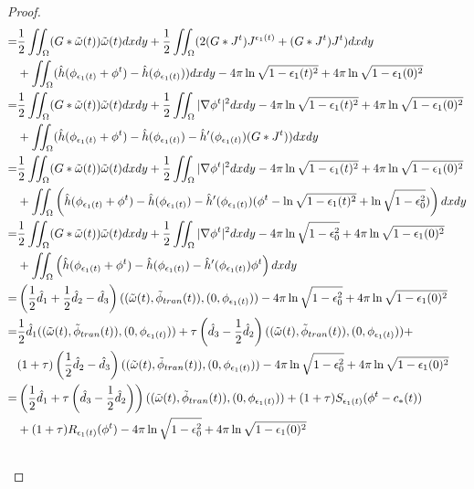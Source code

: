 \documentclass[1 [leqno, 11pt]{amsart}
\numberwithin{equation}{section}
\let\ep=\epsilon
\begin{document}
\begin{CJK*}{GBK}{song}
\begin{proof}
\begin{align}
=&{1\over2}\iint_\Omega (G*\tilde \omega(t))\tilde\omega(t) dxdy+{1\over2}\iint_\Omega (2(G*J^t)J^{\ep_1(t)}+(G*J^t)J^t) dxdy\\\nonumber
&+\iint_\Omega (\hat h(\phi_{\ep_1(t)}+\phi^t)-\hat h (\phi_{\ep_1(t)})) dxdy-4\pi\ln\sqrt{1-\ep_1(t)^2}+4\pi\ln\sqrt{1-\ep_1(0)^2}\\\nonumber
=&{1\over2}\iint_\Omega (G*\tilde \omega(t))\tilde\omega(t) dxdy+{1\over2}\iint_\Omega |\nabla\phi^t|^2 dxdy-4\pi\ln\sqrt{1-\ep_1(t)^2}+4\pi\ln\sqrt{1-\ep_1(0)^2}\\\nonumber
&+\iint_\Omega (\hat h(\phi_{\ep_1(t)}+\phi^t)-\hat h (\phi_{\ep_1(t)})-\hat h '(\phi_{\ep_1(t)})(G*J^t)) dxdy\\\nonumber
=&{1\over2}\iint_\Omega (G*\tilde \omega(t))\tilde\omega(t) dxdy+{1\over2}\iint_\Omega |\nabla\phi^t|^2 dxdy-4\pi\ln\sqrt{1-\ep_1(t)^2}+4\pi\ln\sqrt{1-\ep_1(0)^2}\\\nonumber
&+\iint_\Omega \left(\hat h(\phi_{\ep_1(t)}+\phi^t)-\hat h (\phi_{\ep_1(t)})-\hat h '(\phi_{\ep_1(t)})(\phi^t-\ln\sqrt{1-\ep_1(t)^2}+\ln\sqrt{1-\ep_0^2}) \right)dxdy\\\nonumber
=&{1\over2}\iint_\Omega (G*\tilde \omega(t))\tilde\omega(t) dxdy+{1\over2}\iint_\Omega |\nabla\phi^t|^2 dxdy-4\pi\ln\sqrt{1-\ep_0^2}+4\pi\ln\sqrt{1-\ep_1(0)^2}\\\nonumber
&+\iint_\Omega \left(\hat h(\phi_{\ep_1(t)}+\phi^t)-\hat h (\phi_{\ep_1(t)})-\hat h '(\phi_{\ep_1(t)})\phi^t \right)dxdy\\\nonumber
 =&\left({1\over2}\hat d_1+{1\over2}\hat d_2-\hat d_3\right)((\tilde \omega(t),\tilde \phi_{tran}(t)), ( 0, \phi_{\ep_1(t)}))-4\pi\ln\sqrt{1-\ep_0^2}+4\pi\ln\sqrt{1-\ep_1(0)^2}\\\nonumber
 =&{1\over2}\hat d_1((\tilde \omega(t),\tilde \phi_{tran}(t)), ( 0, \phi_{\ep_1(t)})) +
 \tau \left(\hat d_3-{1\over2}\hat d_2\right)((\tilde \omega(t),\tilde \phi_{tran}(t)), ( 0, \phi_{\ep_1(t)}))+\\\nonumber
 &(1+\tau) \left({1\over2}\hat d_2-\hat d_3\right)((\tilde \omega(t),\tilde \phi_{tran}(t)), ( 0, \phi_{\ep_1(t)}))-4\pi\ln\sqrt{1-\ep_0^2}+4\pi\ln\sqrt{1-\ep_1(0)^2} \\\nonumber
 =& \left( {1\over2}\hat d_1+\tau \left(\hat d_3-{1\over2}\hat d_2\right)\right)((\tilde \omega(t),\tilde \phi_{tran}(t)), ( 0, \phi_{\ep_1(t)}))
 + (1+\tau) S_{\ep_1(t)}( \phi^t-c_*(t))\\\nonumber
 &+(1+\tau)R_{\ep_1(t)}(\phi^t)-4\pi\ln\sqrt{1-\ep_0^2}+4\pi\ln\sqrt{1-\ep_1(0)^2}\\\nonumber

\end{align}
\end{proof}
\end{CJK*}
\end{document}
